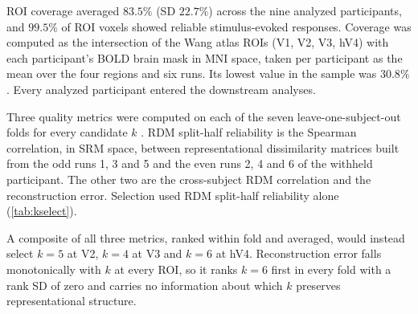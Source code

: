 

ROI coverage averaged $83.5\%$ (SD $22.7\%$) across the nine analyzed participants, and $99.5\%$ of ROI voxels showed reliable stimulus-evoked responses. Coverage was computed as the intersection of the Wang atlas ROIs (V1, V2, V3, hV4) with each participant's BOLD brain mask in MNI space, taken per participant as the mean over the four regions and six runs. Its lowest value in the sample was $30.8\%$. Every analyzed participant entered the downstream analyses.




Three quality metrics were computed on each of the seven leave-one-subject-out folds for every candidate $k$ \parencite{cunningham2014}. RDM split-half reliability is the Spearman correlation, in SRM space, between representational dissimilarity matrices built from the odd runs 1, 3 and 5 and the even runs 2, 4 and 6 of the withheld participant. The other two are the cross-subject RDM correlation and the reconstruction error. Selection used RDM split-half reliability alone (\cref{tab:kselect}).

A composite of all three metrics, ranked within fold and averaged, would instead select $k = 5$ at V2, $k = 4$ at V3 and $k = 6$ at hV4. Reconstruction error falls monotonically with $k$ at every ROI, so it ranks $k = 6$ first in every fold with a rank SD of zero and carries no information about which $k$ preserves representational structure.


